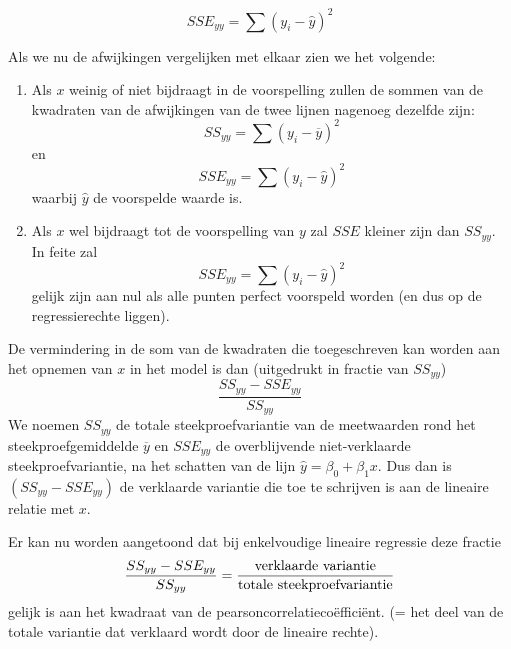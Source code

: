 \[ SSE_{yy} = \sum(y_{i} - \widehat{y})^{2} \]

 Als we nu de afwijkingen vergelijken met elkaar zien we het volgende:
\begin{enumerate}
  \item Als $x$ weinig of niet bijdraagt in de voorspelling zullen de sommen van de kwadraten van de afwijkingen van de twee lijnen nagenoeg dezelfde zijn:
    \[ SS_{yy} = \sum(y_{i} - \overline{y})^{2} \] en
    \[ SSE_{yy} = \sum(y_{i} - \widehat{y})^{2} \]
    waarbij $\widehat{y}$ de voorspelde waarde is.
  \item Als $x$ wel bijdraagt tot de voorspelling van $y$ zal $SSE$ kleiner zijn dan $SS_{yy}$. In feite zal
    \[	SSE_{yy} = \sum(y_{i} - \widehat{y})^{2} \]
    gelijk zijn aan nul als alle punten perfect voorspeld worden (en dus op de regressierechte liggen).
\end{enumerate}

De vermindering in de som van de kwadraten die toegeschreven kan worden aan het opnemen van $x$ in het model is dan (uitgedrukt in fractie van $SS_{yy}$)
\[ \frac{SS_{yy} - SSE_{yy}}{SS_{yy}} \]
We noemen $SS_{yy}$ de totale steekproefvariantie van de meetwaarden rond het steekproefgemiddelde $\overline{y}$ en $SSE_{yy}$ de overblijvende niet-verklaarde steekproefvariantie, na het schatten van de lijn $\widehat{y} = \beta_{0} + \beta_{1}x$. Dus dan is $(SS_{yy} - SSE_{yy})$ de verklaarde variantie die toe te schrijven is aan de lineaire relatie met $x$.

Er kan nu worden aangetoond dat bij enkelvoudige lineaire regressie deze fractie
\[ \frac{SS_{yy} - SSE_{yy}}{SS_{yy}} = \frac{\textnormal{verklaarde variantie}}{\textnormal{totale steekproefvariantie}} \]
gelijk is aan het kwadraat van de pearsoncorrelatieco\"effici\"ent.  (= het deel van de totale variantie dat verklaard wordt door de lineaire rechte).


